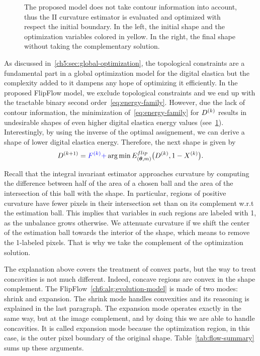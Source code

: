 \begin{figure}
\begin{minipage}{0.49\textwidth}
\label{ch6:fig:contour-info-2}
\end{minipage}%
\caption{  The proposed model does not take contour information into account, thus the II curvature estimator is evaluated and optimized with respect the initial boundary. In the left, the initial shape and the optimization variables colored in yellow. In the right, the final shape without taking the complementary solution.}
\label{ch6:fig:contour-info}
\end{figure}
 As discussed in~\cref{ch5:sec:global-optimization}, the topological constraints are a fundamental part in a global optimization model for the digital elastica but the complexity added to it dampens any hope of optimizing it efficiently. In the proposed FlipFlow model, we exclude topological constraints and we end up with the tractable binary second order~\cref{eq:energy-family}. However, due the lack of contour information, the minimization of~\cref{eq:energy-family} for $D^{(k)}$ results in undesirable shapes of even higher digital elastica energy values  (see~\cref{ch6:fig:contour-info}). Interestingly, by using the inverse of the optimal assignement, we can derive a shape of lower digital elastica energy. Therefore, the next shape is given by
\begin{align*}
	D^{(k+1)} = {\color{blue}{F^{(k)} + }} \operatorname*{arg\,min} _{}{E_{(\bm{\theta},m)}^{flip}\big(D^{(k)},1-X^{(k)}} \big).
\end{align*}
%
Recall that the integral invariant estimator approaches curvature by computing the difference between half of the area
of a chosen ball and the area of the intersection of this ball with the shape.  In particular, regions of positive
curvature have fewer pixels in their intersection set than on its complement w.r.t the estimation ball. This implies
that variables in such regions are labeled with 1, as the unbalance grows otherwise. We attenuate curvature if we shift
the center of the estimation ball towards the interior of the shape, which means to remove the 1-labeled pixels. That is
why we take the complement of the optimization solution.


The explanation above covers the treatment of convex parts, but the way to treat concavities is not much different. Indeed, concave regions are convex in the shape complement. The FlipFlow~\cref{ch6:alg:evolution-model} is made of two modes: shrink and expansion. The shrink mode handles convexities and its reasoning is explained in the last paragraph. The expansion mode operates exactly in the same way, but at the image complement, and by doing this we are able to handle
concavities. It is called expansion mode because the optimization region, in this case, is the outer pixel boundary of
the original shape. Table~\cref{tab:flow-summary} sums up these arguments.

